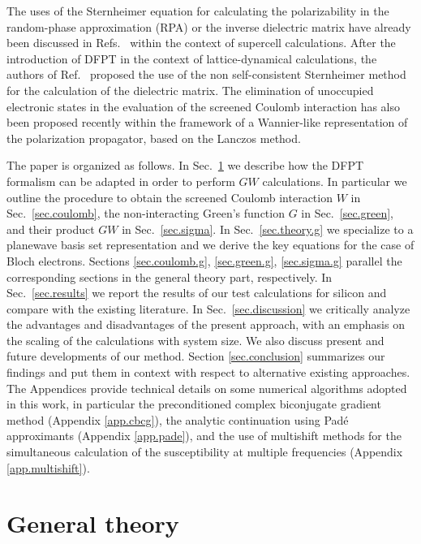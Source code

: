 \documentclass[twocolumn,prb,showpacs,superscriptaddress]{revtex4}
\begin{document}
The uses of the Sternheimer equation for calculating the polarizability
in the random-phase approximation (RPA) or the inverse dielectric matrix 
have already been discussed in Refs.\  
within the context of supercell calculations. After the introduction 
of DFPT in the context of lattice-dynamical calculations,\cite{giannozzi} 
the authors of Ref.\  proposed the
use of the non self-consistent Sternheimer method for the calculation
of the dielectric matrix. The elimination of unoccupied electronic states
in the evaluation of the screened Coulomb interaction has also been 
proposed recently within the framework of a Wannier-like representation
of the polarization propagator, based on the Lanczos method.\cite{umari1,umari2}

The paper is organized as follows. In Sec.\ \ref{sec.theory} we describe
how the DFPT formalism can be adapted in order to perform $GW$ calculations.
In particular we outline the procedure to obtain the screened Coulomb
interaction $W$ in Sec.\ \ref{sec.coulomb}, the non-interacting Green's function
$G$ in Sec.\ \ref{sec.green}, and their product $GW$ in Sec.\ \ref{sec.sigma}.
In Sec.\ \ref{sec.theory.g} we specialize to a planewave basis set representation
and we derive the key equations for the case of Bloch electrons.
Sections \ref{sec.coulomb.g}, \ref{sec.green.g}, \ref{sec.sigma.g}
parallel the corresponding sections in the general theory part, respectively.
In Sec.\ \ref{sec.results} we report the results of our test calculations
for silicon and compare with the existing literature.
In Sec.\ \ref{sec.discussion} we critically analyze the advantages 
and disadvantages of the present approach, with an emphasis on the
scaling of the calculations with system size. We also discuss
present and future developments of our method.
Section \ref{sec.conclusion} summarizes our findings and put them
in context with respect to alternative existing approaches.
The Appendices provide technical details on some numerical algorithms adopted
in this work, in particular
the preconditioned complex biconjugate gradient method (Appendix \ref{app.cbcg}),
the analytic continuation using Pad\'e approximants (Appendix \ref{app.pade}),
and the use of multishift methods for the simultaneous calculation of 
the susceptibility at multiple frequencies (Appendix \ref{app.multishift}).

\section{General theory}\label{sec.theory}
\end{document}
